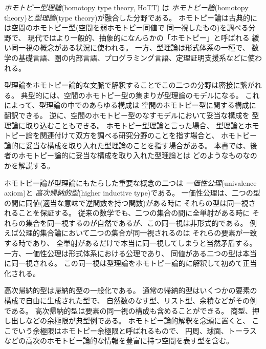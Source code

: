 \documentclass[index]{subfiles}
\begin{document}

\emph{ホモトピー型理論}(homotopy type theory, HoTT) は
\emph{ホモトピー論}(homotopy theory)と\emph{型理論}(type theory)が融合した分野である。
ホモトピー論は古典的には空間のホモトピー型(空間を弱ホモトピー同値で
同一視したもの)を調べる分野で、
現代ではより一般的、抽象的になんらかの「ホモトピー」と呼ばれる
緩い同一視の概念がある状況に使われる。
一方、型理論は形式体系の一種で、
数学の基礎言語、圏の内部言語、プログラミング言語、定理証明支援系などに使われる。

型理論をホモトピー論的な文脈で解釈することでこの二つの分野は密接に繋がれる。
典型的には、空間のホモトピー型の集まりが型理論のモデルになる。
これによって、型理論の中でのあらゆる構成は
空間のホモトピー型に関する構成に翻訳できる。
逆に、空間のホモトピー型のなすモデルにおいて妥当な構成を
型理論に取り込むこともできる。
ホモトピー型理論と言った場合、
型理論とホモトピー論を関連付けて双方を調べる研究分野のことを指す場合と、
ホモトピー論的に妥当な構成を取り入れた型理論のことを指す場合がある。
本書では、後者のホモトピー論的に妥当な構成を取り入れた型理論とは
どのようなものなのかを解説する。

ホモトピー論が型理論にもたらした重要な概念の二つは
\emph{一価性公理}(univalence axiom)と
\emph{高次帰納的型}(higher inductive type)である。
一価性公理は、二つの型の間に同値(適当な意味で逆関数を持つ関数)がある時に
それらの型は同一視されることを保証する。
従来の数学でも、二つの集合の間に全単射がある時に
それらの集合を同一視するのが自然であるが、この同一視は非形式的である。
例えば公理的集合論において二つの集合が同一視されるのは
それらの要素が一致する時であり、
全単射があるだけで本当に同一視してしまうと当然矛盾する。
一方、一価性公理は形式体系における公理であり、
同値がある二つの型は本当に同一視される。
この同一視は型理論をホモトピー論的に解釈して初めて正当化される。

高次帰納的型は帰納的型の一般化である。
通常の帰納的型はいくつかの要素の構成で自由に生成された型で、
自然数のなす型、リスト型、余積などがその例である。
高次帰納的型は要素の同一視の構成も含めることができる。
商型、押し出しなどの余極限が典型例である。
ホモトピー論的解釈を念頭に置くと、
ここでいう余極限はホモトピー余極限と呼ばれるもので、
円周、球面、トーラスなどの高次のホモトピー論的な情報を豊富に持つ空間を表す型を含む。

\begin{mySubsections}
  
  
\end{mySubsections}
\end{document}
